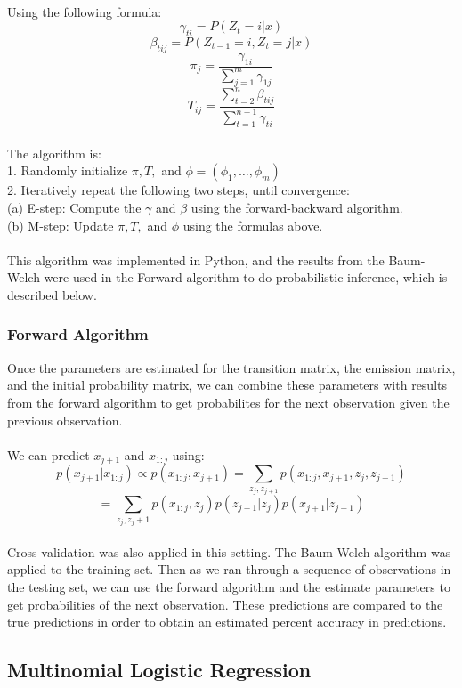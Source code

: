 \documentclass{article}
\begin{document}
\\ 
Using the following formula: \\
$$\gamma_{ti} = P(Z_t = i|x) $$
$$\beta_{tij} = P(Z_{t-1} = i, Z_t = j |x) $$
$$\pi_j = \dfrac{\gamma_{1i}}{\sum_{j=1}^m \gamma_{1j}}$$
$$T_{ij} = \dfrac{\sum_{t=2}^n \beta_{tij}}{ \sum_{t=1}^{n-1} \gamma_{ti}}$$ 
\\ 
The algorithm is: \\ 
1. Randomly initialize $\pi, T, $ and $\phi = (\phi_1,\hdots, \phi_m)$\\ 
2. Iteratively repeat the following two steps, until convergence: \\ 
(a) E-step: Compute the $\gamma$ and $\beta$ using the forward-backward algorithm.\\ 
(b) M-step: Update $\pi, T,$ and $\phi$ using the formulas above.\\
\\ 
This algorithm was implemented in Python, and the results from the Baum-Welch were used in the Forward algorithm to do probabilistic inference, which is described below. 

\subsubsection{Forward Algorithm}

Once the parameters are estimated for the transition matrix, the emission matrix, and the initial probability matrix, we can combine these parameters with results from the forward algorithm to get probabilites for the next observation given the previous observation.  \\ 
\\ 
We can predict $x_{j+1}$ and $x_{1:j}$ using: \\ 
$$p(x_{j+1}|x_{1:j}) \propto p(x_{1:j}, x_{j+1}) = \sum_{z_j, z_{j+1}} p(x_{1:j}, x_{j+1}, z_j, z_{j+1})$$
$$ = \sum_{z_j, z_j+1} p(x_{1:j}, z_j) p(z_{j+1}|z_j) p(x_{j+1}|z_{j+1})$$
\\ 
Cross validation was also applied in this setting. The Baum-Welch algorithm was applied to the training set. Then as we ran through a sequence of observations in the testing set, we can use the forward algorithm and the estimate parameters to get probabilities of the next observation. These predictions are compared to the true predictions in order to obtain an estimated percent accuracy in predictions.

\subsection{Multinomial Logistic Regression}
\end{document}
